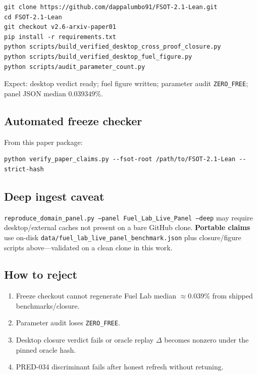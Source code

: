 \documentclass[11pt,a4paper]{article}
\begin{document}
\begin{verbatim}
git clone https://github.com/dappalumbo91/FSOT-2.1-Lean.git
cd FSOT-2.1-Lean
git checkout v2.6-arxiv-paper01
pip install -r requirements.txt
python scripts/build_verified_desktop_cross_proof_closure.py
python scripts/build_verified_desktop_fuel_figure.py
python scripts/audit_parameter_count.py
\end{verbatim}

Expect: desktop verdict ready; fuel figure written; parameter audit
\texttt{ZERO\_FREE}; panel JSON median $0.039349\%$.

\subsection{Automated freeze checker}

From this paper package:
\begin{verbatim}
python verify_paper_claims.py --fsot-root /path/to/FSOT-2.1-Lean --strict-hash
\end{verbatim}

\subsection{Deep ingest caveat}

\texttt{reproduce\_domain\_panel.py --panel Fuel\_Lab\_Live\_Panel --deep}
may require desktop/external caches not present on a bare GitHub clone.
\textbf{Portable claims} use on-disk
\texttt{data/fuel\_lab\_live\_panel\_benchmark.json} plus closure/figure
scripts above---validated on a clean clone in this work.

\subsection{How to reject}

\begin{enumerate}[leftmargin=*]
\item Freeze checkout cannot regenerate Fuel Lab median $\approx 0.039\%$ from
      shipped benchmarks/closure.
\item Parameter audit loses \texttt{ZERO\_FREE}.
\item Desktop closure verdict fails or oracle replay $\Delta$ becomes nonzero
      under the pinned oracle hash.
\item PRED-034 discriminant fails after honest refresh without retuning.
\end{enumerate}
\end{document}
